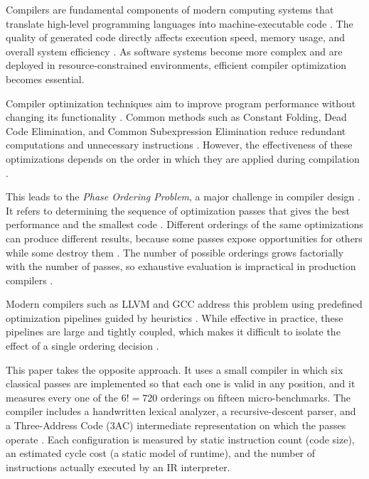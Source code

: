 \documentclass[conference]{IEEEtran}
\begin{document}
Compilers are fundamental components of modern computing systems that translate high-level programming languages into machine-executable code \cite{ref21}. The quality of generated code directly affects execution speed, memory usage, and overall system efficiency \cite{ref18}. As software systems become more complex and are deployed in resource-constrained environments, efficient compiler optimization becomes essential.

Compiler optimization techniques aim to improve program performance without changing its functionality \cite{ref21}. Common methods such as Constant Folding, Dead Code Elimination, and Common Subexpression Elimination reduce redundant computations and unnecessary instructions \cite{ref18}. However, the effectiveness of these optimizations depends on the order in which they are applied during compilation \cite{ref19}.

This leads to the \textit{Phase Ordering Problem}, a major challenge in compiler design \cite{ref1}. It refers to determining the sequence of optimization passes that gives the best performance and the smallest code \cite{ref2}. Different orderings of the same optimizations can produce different results, because some passes expose opportunities for others while some destroy them \cite{ref19}. The number of possible orderings grows factorially with the number of passes, so exhaustive evaluation is impractical in production compilers \cite{ref2}.

Modern compilers such as LLVM and GCC address this problem using predefined optimization pipelines guided by heuristics \cite{ref16}. While effective in practice, these pipelines are large and tightly coupled, which makes it difficult to isolate the effect of a single ordering decision \cite{ref16}.

This paper takes the opposite approach. It uses a small compiler in which six classical passes are implemented so that each one is valid in any position, and it measures every one of the $6! = 720$ orderings on fifteen micro-benchmarks. The compiler includes a handwritten lexical analyzer, a recursive-descent parser, and a Three-Address Code (3AC) intermediate representation on which the passes operate \cite{ref18}. Each configuration is measured by static instruction count (code size), an estimated cycle cost (a static model of runtime), and the number of instructions actually executed by an IR interpreter.
\end{document}

